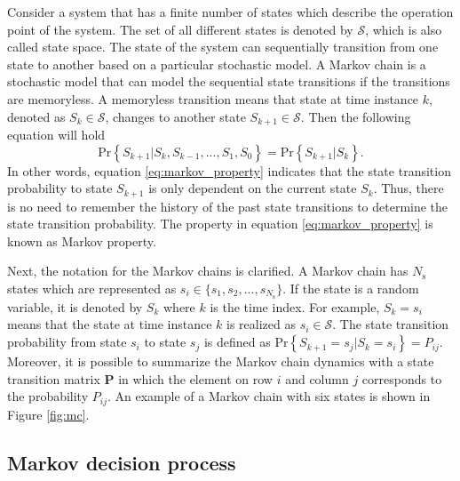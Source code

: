 \documentclass[english, 12pt, a4paper, elec, utf8, a-1b, online]{aaltothesis}
\renewcommand{\vec}[1]{\mathbf{#1}}
\newcommand{\Ss}{\mathcal{S}}
\renewcommand{\Pr}[1]{\text{Pr}\left\{ #1 \right\}}
\newcommand{\stprobs}{\vec{P}}
\newcommand{\nstates}{{N_\text{s}}}
\begin{document}
Consider a system that has a finite number of states which describe the operation point of the system.
The set of all different states is denoted by $\Ss$, which is also called state space.
The state of the system can sequentially transition from one state to another based on a particular stochastic model.
A Markov chain is a stochastic model that can model the sequential state transitions if the transitions are memoryless.
A memoryless transition means that state at time instance $k$, denoted as $S_k \in \Ss$, changes to another state $S_{k+1} \in \Ss$.
Then the following equation will hold   
\begin{equation} \label{eq:markov_property}
    \Pr{S_{k+1} | S_k, S_{k-1}, ..., S_1, S_0} = \Pr{S_{k+1} | S_k}.
\end{equation}
In other words, equation \eqref{eq:markov_property} indicates that the state transition probability to state $S_{k+1}$ is only dependent on the current state $S_k$.
Thus, there is no need to remember the history of the past state transitions to determine the state transition probability.
The property in equation \eqref{eq:markov_property} is known as Markov property.

Next, the notation for the Markov chains is clarified.
A Markov chain has $\nstates$ states which are represented as $s_i \in \{s_1, s_2, ..., s_{\nstates} \}$.
If the state is a random variable, it is denoted by $S_k$ where $k$ is the time index.
For example, $S_k = s_i$ means that the state at time instance $k$ is realized as $s_i \in \Ss$. 
The state transition probability from state $s_i$ to state $s_j$ is defined as $\Pr{S_{k+1}=s_j | S_{k}=s_i}=P_{ij}$.
Moreover, it is possible to summarize the Markov chain dynamics with a state transition matrix $\stprobs$ in which the element on row $i$ and column $j$ corresponds to the probability $P_{ij}$.
An example of a Markov chain with six states is shown in Figure \ref{fig:mc}.

\subsection{Markov decision process} \label{sec:MDP}
\end{document}
